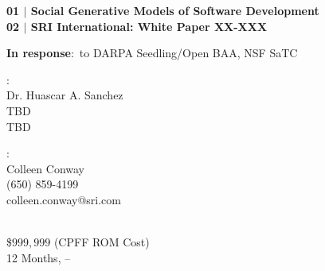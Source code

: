 \documentclass[11pt,letterpaper,twoside]{article}
\begin{document}
\thispagestyle{FirstPage}

\begingroup
\setlength{\parindent}{0pt}%
\setlength{\tabcolsep}{0pt}%
{\calibrib\large \bfseries 01 $\vert$ Social Generative Models of Software Development \\
  \textcolor{sriblue}{02 $\vert$ SRI International: White Paper XX-XXX}}
\smallskip\noindent
\noindent
\endgroup

\hspace{3mm} {\calibrir \normalsize{{\bfseries
\textcolor{sgray}{\calibrib In response}}$:$ to DARPA Seedling\//Open BAA, NSF SaTC}}

\begin{multicols}{2}
:\\
{}    {\calibrir Dr. Huascar A. Sanchez} \\
{} {\calibrir TBD} \\
{} {\calibrir TBD}

\columnbreak

:\\
{} {\calibrir Colleen Conway} \\
{} {\calibrir(650) 859-4199} \\
{} {\calibrir colleen.conway@sri.com}
\end{multicols}

\smallskip{}\\
{} \$$999,999$ (CPFF ROM Cost)\\
{} 12 Months,
 -- \\
{}
\vskip 5mm

\setcounter{section}{4}






\end{document}
